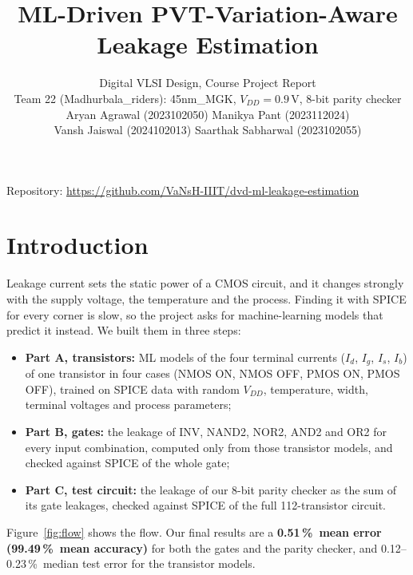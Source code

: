 \documentclass[11pt,a4paper]{article}
\title{\textbf{ML-Driven PVT-Variation-Aware}\\ \textbf{Leakage Estimation}}
\author{Digital VLSI Design, Course Project Report\\[2pt]
Team 22 (Madhurbala\_riders): 45nm\_MGK, $V_{DD} = 0.9$\,V, 8-bit parity checker\\[8pt]
Aryan Agrawal (2023102050) \qquad Manikya Pant (2023112024)\\
Vansh Jaiswal (2024102013) \qquad Saarthak Sabharwal (2023102055)}
\date{}
\newcommand{\pct}{\,\%}
\begin{document}
\sloppy
\maketitle
\vspace{-1.5em}
\begin{center}
Repository: \url{https://github.com/VaNsH-IIIT/dvd-ml-leakage-estimation}
\end{center}

\section{Introduction}

Leakage current sets the static power of a CMOS circuit, and it changes strongly with the supply
voltage, the temperature and the process. Finding it with SPICE for every corner is slow, so the
project asks for machine-learning models that predict it instead. We built them in three steps:

\begin{itemize}
    \item \textbf{Part A, transistors:} ML models of the four terminal currents
    ($I_d$, $I_g$, $I_s$, $I_b$) of one transistor in four cases (NMOS ON, NMOS OFF, PMOS ON,
    PMOS OFF), trained on SPICE data with random $V_{DD}$, temperature, width, terminal voltages
    and process parameters;
    \item \textbf{Part B, gates:} the leakage of INV, NAND2, NOR2, AND2 and OR2 for every input
    combination, computed only from those transistor models, and checked against SPICE of the
    whole gate;
    \item \textbf{Part C, test circuit:} the leakage of our 8-bit parity checker as the sum of its
    gate leakages, checked against SPICE of the full 112-transistor circuit.
\end{itemize}

Figure~\ref{fig:flow} shows the flow. Our final results are a \textbf{0.51\pct\ mean error
(99.49\pct\ mean accuracy)} for both the gates and the parity checker, and 0.12--0.23\pct\
median test error for the transistor models.
\end{document}
